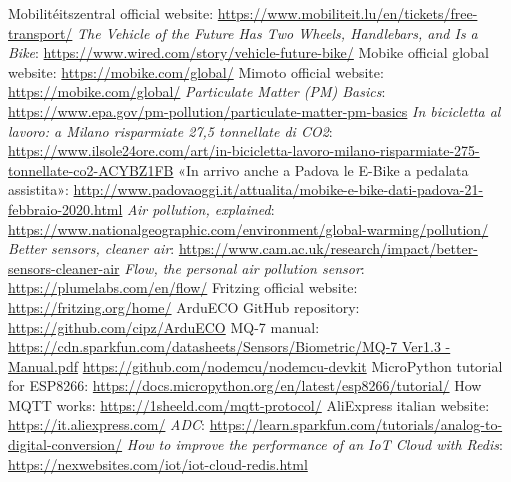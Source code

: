 \begin{thebibliography}{00}
	
 Mobilitéitszentral official website:  \url{https://www.mobiliteit.lu/en/tickets/free-transport/}
 \textit{The Vehicle of the Future Has Two Wheels, Handlebars, and Is a Bike}:  \url{https://www.wired.com/story/vehicle-future-bike/}
 Mobike official global website: \url{https://mobike.com/global/}
 Mimoto official website: \url{https://mobike.com/global/}
 \textit{Particulate Matter (PM) Basics}: \href{https://www.epa.gov/pm-pollution/particulate-matter-pm-basics}{https://www.epa.gov/pm-pollution/particulate-matter-pm-basics}
 \textit{In bicicletta al lavoro: a Milano risparmiate 27,5 tonnellate di CO2}:  \url{https://www.ilsole24ore.com/art/in-bicicletta-lavoro-milano-risparmiate-275-tonnellate-co2-ACYBZ1FB}
 «In arrivo anche a Padova le E-Bike a pedalata assistita»: \href{http://www.padovaoggi.it/attualita/mobike-e-bike-dati-padova-21-febbraio-2020.html}{http://www.padovaoggi.it/attualita/mobike-e-bike-dati-padova-21-febbraio-2020.html}
 \textit{Air pollution, explained}: \href{https://www.nationalgeographic.com/environment/global-warming/pollution/}{https://www.nationalgeographic.com/environment/global-warming/pollution/}
 \textit{Better sensors, cleaner air}: \href{https://www.cam.ac.uk/research/impact/better-sensors-cleaner-air}{https://www.cam.ac.uk/research/impact/better-sensors-cleaner-air}
 \textit{Flow, the personal air pollution sensor}: \href{https://plumelabs.com/en/flow/}{https://plumelabs.com/en/flow/}
 Fritzing official website: \href{https://fritzing.org/home/}{https://fritzing.org/home/}
 ArduECO GitHub repository:  \href{https://github.com/cipz/ArduECO}{https://github.com/cipz/ArduECO}
 MQ-7 manual: \href{https://cdn.sparkfun.com/datasheets/Sensors/Biometric/MQ-7 Ver1.3 - Manual.pdf}{https://cdn.sparkfun.com/datasheets/Sensors/Biometric/MQ-7 Ver1.3 - Manual.pdf}
 \href{https://github.com/nodemcu/nodemcu-devkit}{https://github.com/nodemcu/nodemcu-devkit}
 MicroPython tutorial for ESP8266: \url{https://docs.micropython.org/en/latest/esp8266/tutorial/}
 How MQTT works:  \href{https://1sheeld.com/mqtt-protocol/}{https://1sheeld.com/mqtt-protocol/}
 AliExpress italian website: \href{https://it.aliexpress.com/}{https://it.aliexpress.com/}
 \textit{ADC}:  \url{https://learn.sparkfun.com/tutorials/analog-to-digital-conversion/}
 \textit{How to improve the performance of an IoT Cloud with Redis}: \href{https://nexwebsites.com/iot/iot-cloud-redis.html}{https://nexwebsites.com/iot/iot-cloud-redis.html}



\end{thebibliography}
